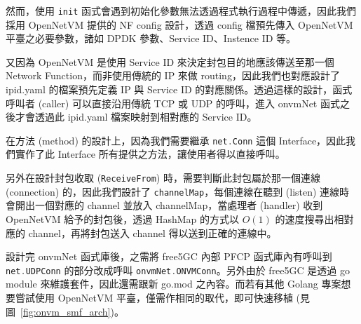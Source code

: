 然而，使用 \lstinline[language=Go]{init} 函式會遇到初始化參數無法透過程式執行過程中傳遞，因此我們採用 OpenNetVM 提供的 NF config 設計，透過 config 檔預先傳入 OpenNetVM 平臺之必要參數，諸如 DPDK 參數、Service ID、Instence ID 等。

又因為 OpenNetVM 是使用 Service ID 來決定封包目的地應該傳送至那一個 Network Function，而非使用傳統的 IP 來做 routing，因此我們也對應設計了 ipid.yaml 的檔案預先定義 IP 與 Service ID 的對應關係。透過這樣的設計，函式呼叫者 (caller) 可以直接沿用傳統 TCP 或 UDP 的呼叫，進入 onvmNet 函式之後才會透過此 ipid.yaml 檔案映射到相對應的 Service ID。

在方法 (method) 的設計上，因為我們需要繼承 \lstinline[language=Go]{net.Conn} 這個 Interface，因此我們實作了此 Interface 所有提供之方法，讓使用者得以直接呼叫。

另外在設計封包收取 (\lstinline[language=Go]{ReceiveFrom}) 時，需要判斷此封包屬於那一個連線 (connection) 的，因此我們設計了 \lstinline{channelMap}，每個連線在聽到 (listen) 連線時會開出一個對應的 channel 並放入 channelMap，當處理者 (handler) 收到 OpenNetVM 給予的封包後，透過 HashMap 的方式以 $O(1)$ 的速度搜尋出相對應的 channel，再將封包送入 channel 得以送到正確的連線中。

設計完 onvmNet 函式庫後，之需將 free5GC 內部 PFCP 函式庫內有呼叫到 \lstinline[language=Go]{net.UDPConn} 的部分改成呼叫 \lstinline[language=Go]{onvmNet.ONVMConn}。另外由於 free5GC 是透過 go module 來維護套件，因此還需跟新 go.mod 之內容。而若有其他 Golang 專案想要嘗試使用 OpenNetVM 平臺，僅需作相同的取代，即可快速移植 (見圖~\ref{fig:onvm_smf_arch})。

